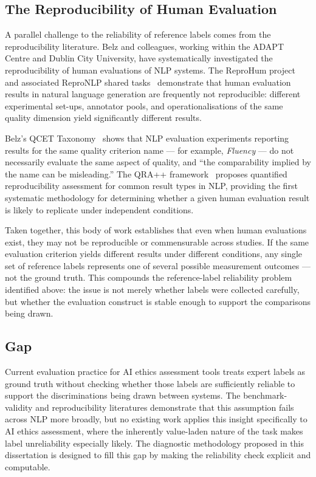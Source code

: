 \subsection{The Reproducibility of Human Evaluation}

A parallel challenge to the reliability of reference labels comes from the
reproducibility literature.  Belz and colleagues, working within the ADAPT
Centre and Dublin City University, have systematically investigated the
reproducibility of human evaluations of NLP systems.  The ReproHum project
and associated ReproNLP shared tasks~\cite{belz2025gem} demonstrate that
human evaluation results in natural language generation are frequently not
reproducible: different experimental set-ups, annotator pools, and
operationalisations of the same quality dimension yield significantly different
results.

Belz's QCET Taxonomy~\cite{belz2025qcet} shows that NLP evaluation
experiments reporting results for the same quality criterion name --- for
example, \emph{Fluency} --- do not necessarily evaluate the same aspect of
quality, and ``the comparability implied by the name can be misleading.''
The QRA++ framework~\cite{belz2025qra} proposes quantified reproducibility
assessment for common result types in NLP, providing the first systematic
methodology for determining whether a given human evaluation result is likely
to replicate under independent conditions.

Taken together, this body of work establishes that even when human evaluations
exist, they may not be reproducible or commensurable across studies.  If the
same evaluation criterion yields different results under different conditions,
any single set of reference labels represents one of several possible
measurement outcomes --- not the ground truth.  This compounds the
reference-label reliability problem identified above: the issue is not merely
whether labels were collected carefully, but whether the evaluation construct
is stable enough to support the comparisons being drawn.

\subsection{Gap}

Current evaluation practice for AI ethics assessment tools treats expert
labels as ground truth without checking whether those labels are sufficiently
reliable to support the discriminations being drawn between systems.  The
benchmark-validity and reproducibility literatures demonstrate that this
assumption fails across NLP more broadly, but no existing work applies this
insight specifically to AI ethics assessment, where the inherently value-laden
nature of the task makes label unreliability especially likely.  The
diagnostic methodology proposed in this dissertation is designed to fill this
gap by making the reliability check explicit and computable.

